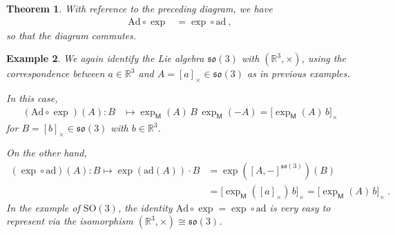 \documentclass[10pt,a4paper]{article}
\theoremstyle{mytheorem}
\newtheorem{theorem}{Theorem}[section]
\theoremstyle{mydefinition}
\newtheorem{example}[theorem]{Example}
\newcommand{\ad}{\mathrm{ad}}
\newcommand{\Ad}{\mathrm{Ad}}
\newcommand{\SO}{\mathrm{SO}}
\newcommand{\fso}{\mathfrak{so}}
\begin{document}
\begin{theorem}
\label{th:AdExp}
With reference to the preceding diagram, we have
\begin{align*}
	\Ad\circ\exp &= \exp\circ\ad
	\ ,
\end{align*}
so that the diagram commutes.
\end{theorem}

\begin{example}
We again identify the Lie algebra $\fso(3)$ with $(\mathbb{R}^3,\times)$, using the correspondence between $a\in\mathbb{R}^3$ and $A=[a]_\times\in\fso(3)$ as in previous examples.

In this case,
\begin{align*}
	(\Ad\circ\exp)(A): 
	B &\mapsto
	\exp_\mathsf{M}(A)\,B\,\exp_\mathsf{M}(-A)
	= 
	\big[	
		\exp_\mathsf{M}(A)\,b
	\big]_\times
\end{align*}
for $B=[b]_\times\in\fso(3)$ with $b\in\mathbb{R}^3$.

On the other hand,
\begin{align*}
	(\exp\circ\ad)(A):
	B \mapsto
	\exp(\ad(A))\cdot B
	&= \exp([A,-]^{\fso(3)})(B)
	\nonumber\\
	&=
	\big[
		\exp_\mathsf{M}([a]_\times)\,b
	\big]_\times
	= \big[
		\exp_\mathsf{M}(A)\,b
	\big]_\times	
	\ .
\end{align*}
In the example of $\SO(3)$, the identity $\Ad\circ\exp=\exp\circ\ad$ is very easy to represent via the isomorphism $(\mathbb{R}^3,\times)\cong\fso(3)$.
\end{example}
\end{document}
